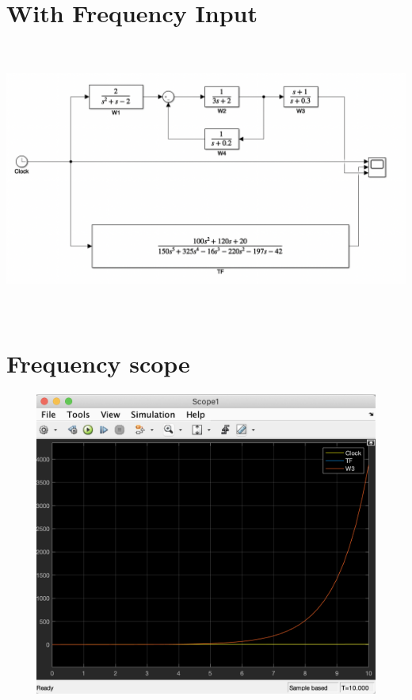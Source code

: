 \documentclass[a4paper,11pt]{article}
\makeatletter
\newcommand{\problemtitle}[1]{\gdef\@problemtitle{#1}}%
\newcommand{\problemquestion}[1]{\gdef\@problemquestion{#1}}%
\newcommand{\problemsolution}[1]{\gdef\@problemsolution{#1}}%
\theoremstyle{mytheor}
\makeatother
\begin{document}
\begin{problem}
  \problemtitle{Part B}
  \problemquestion{Build initial system shown in the block diagram and simplified in one Simulink schema and analyze its Step, Impulse and Frequency responses. Results should have a schema with both systems and 3 Scope plots(for each input). Each plot should have 3 lines - input signal, and two outputs from each system.}
  \problemsolution{
  In both plots Frequency and Step, inital TF and the total TF are close to each other. However, on Impulse there is a slight deviation.
  }
\end{problem}
\section*{With Frequency Input}
\includegraphics[width=15cm, height=9cm]{clock_1.png}
\section*{Frequency scope}
\includegraphics[width=15cm, height=10cm]{clock_2.png}
\end{document}
